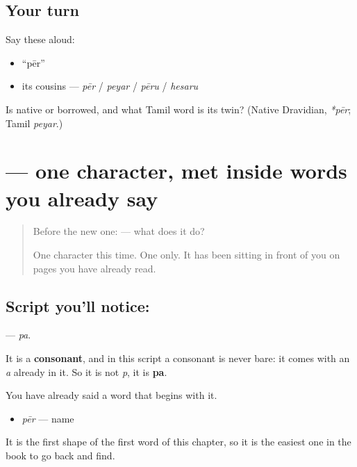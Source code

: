 \subsection*{Your turn}
Say these aloud:

\begin{itemize}
\raggedright
  \item \textquotedblleft{}pēr\textquotedblright{}
  \item its cousins — \emph{pēr} / \emph{peyar} / \emph{pēru} / \emph{hesaru}
\end{itemize}

\begin{tcolorbox}[breakable,colback=teal!4,colframe=teal!35!black,title={Before you move on}]
Is \textbf{} native or borrowed, and what Tamil word is its twin? (Native Dravidian, \emph{*pēr}; Tamil \emph{peyar}.)
\end{tcolorbox}
\section[\texorpdfstring{\ml{പ} (pa)}{പ (pa)}]{ — one character, met inside words you already say}

\label{lesson:ML-S112-letter-pa}



\begin{quote}
Before the new one:  — what does it do?

One character this time. One only. It has been sitting in front of you on pages you have already read.
\end{quote}

\subsection*{Script you'll notice: }
\textbf{} — \emph{pa}.

It is a \textbf{consonant}, and in this script a consonant is never bare: it comes with an \emph{a} already in it. So it is not \emph{p}, it is \textbf{pa}.

You have already said a word that begins with it.

\begin{itemize}
\raggedright
  \item \textbf{} \emph{pēr} — name
\end{itemize}

It is the first shape of the first word of this chapter, so it is the easiest one in the book to go back and find.

